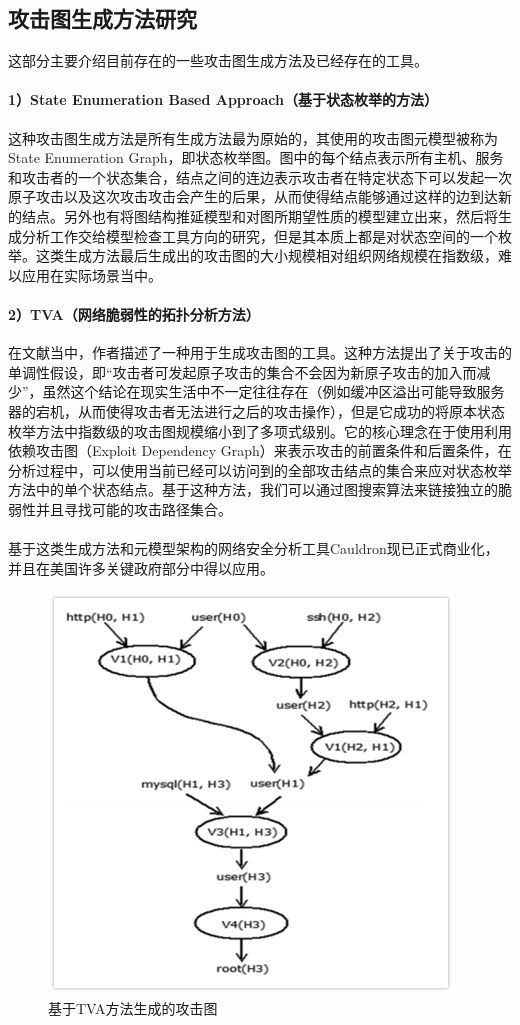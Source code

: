 \documentclass[12pt,a4paper]{article}
\begin{document}
\subsection{攻击图生成方法研究}
这部分主要介绍目前存在的一些攻击图生成方法及已经存在的工具。
\paragraph{1）State Enumeration Based Approach（基于状态枚举的方法）}
这种攻击图生成方法是所有生成方法最为原始的，其使用的攻击图元模型被称为State Enumeration Graph，即状态枚举图。图中的每个结点表示所有主机、服务和攻击者的一个状态集合，结点之间的连边表示攻击者在特定状态下可以发起一次原子攻击以及这次攻击攻击会产生的后果，从而使得结点能够通过这样的边到达新的结点。另外也有将图结构推延模型和对图所期望性质的模型建立出来，然后将生成分析工作交给模型检查工具方向的研究，但是其本质上都是对状态空间的一个枚举。这类生成方法最后生成出的攻击图的大小规模相对组织网络规模在指数级，难以应用在实际场景当中。
\paragraph{2）TVA（网络脆弱性的拓扑分析方法）}
在文献\cite{3}\cite{4}\cite{5}当中，作者描述了一种用于生成攻击图的工具。这种方法提出了关于攻击的单调性假设，即“攻击者可发起原子攻击的集合不会因为新原子攻击的加入而减少”，虽然这个结论在现实生活中不一定往往存在（例如缓冲区溢出可能导致服务器的宕机，从而使得攻击者无法进行之后的攻击操作），但是它成功的将原本状态枚举方法中指数级的攻击图规模缩小到了多项式级别。它的核心理念在于使用利用依赖攻击图（Exploit Dependency Graph）来表示攻击的前置条件和后置条件，在分析过程中，可以使用当前已经可以访问到的全部攻击结点的集合来应对状态枚举方法中的单个状态结点。基于这种方法，我们可以通过图搜索算法来链接独立的脆弱性并且寻找可能的攻击路径集合。
\paragraph{}基于这类生成方法和元模型架构的网络安全分析工具Cauldron现已正式商业化，并且在美国许多关键政府部分中得以应用。
\begin{figure}[!htp]
	\centering
	\includegraphics[scale=0.7]{images/TVA.png} 
	\caption{基于TVA方法生成的攻击图}
\end{figure}
\end{document}
